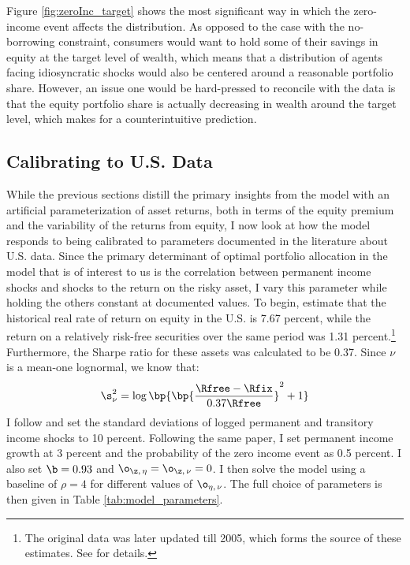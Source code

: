 Figure \ref{fig:zeroInc_target} shows the most significant way in which the zero-income event affects the distribution. As opposed to the case with the no-borrowing constraint, consumers would want to hold some of their savings in equity at the target level of wealth, which means that a distribution of agents facing idiosyncratic shocks would also be centered around a reasonable portfolio share. However, an issue one would be hard-pressed to reconcile with the data is that the equity portfolio share is actually decreasing in wealth around the target level, which makes for a counterintuitive prediction.

\subsection{Calibrating to U.S. Data}\label{us_data}

While the previous sections distill the primary insights from the model with an artificial parameterization of asset returns, both in terms of the equity premium and the variability of the returns from equity, I now look at how the model responds to being calibrated to parameters documented in the literature about U.S. data. Since the primary determinant of optimal portfolio allocation in the model that is of interest to us is the correlation between permanent income shocks and shocks to the return on the risky asset, I vary this parameter while holding the others constant at documented values. To begin, \citet{Mehra1985} estimate that the historical real rate of return on equity in the U.S. is 7.67 percent, while the return on a relatively risk-free securities over the same period was 1.31 percent.\footnote{The original data was later updated till 2005, which forms the source of these estimates. See \citet{Mehra2006} for details.} Furthermore, the Sharpe ratio for these assets was calculated to be 0.37. Since $\nu$ is a mean-one lognormal, we know that:
\[
\s_{\nu}^2 = \log\bp{\bp{\frac{\Rfree - \Rfix}{0.37\Rfree}}^2 + 1}
\]
I follow \citet{Carroll1992} and set the standard deviations of logged permanent and transitory income shocks to 10 percent. Following the same paper, I set permanent income growth at 3 percent and the probability of the zero income event as 0.5 percent. I also set $\b = 0.93$ and $\o_{\z,\,\eta} = \o_{\z,\,\nu} = 0$. I then solve the model using a baseline of $\rho = 4$ for different values of $\o_{\eta,\,\nu}$. The full choice of parameters is then given in Table \ref{tab:model_parameters}.

